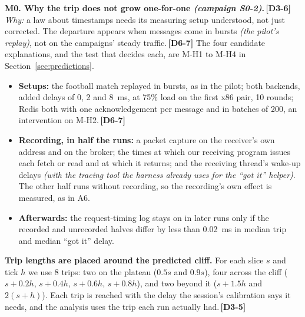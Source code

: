 \documentclass[11pt]{article}
\newcommand{\gl}[1]{{\color{soft}\itshape\small (#1)}}
\newcommand{\chgold}[1]{\,{\color{oldcol}\bfseries\footnotesize[#1]}}
\begin{document}
\textbf{M0. Why the trip does not grow one-for-one \gl{campaign S0-2}.}\chgold{D3-6} \emph{Why:} a law about timestamps needs its measuring setup understood, not just corrected. The departure appears when messages come in bursts \gl{the pilot's replay}, not on the campaigns' steady traffic.\chgold{D6-7} The four candidate explanations, and the test that decides each, are M-H1 to M-H4 in Section~\ref{sec:predictions}.
\begin{itemize}
  \item \textbf{Setups:} the football match replayed in bursts, as in the pilot; both backends, added delays of 0, 2 and 8~ms, at 75\% load on the first x86 pair, 10 rounds; Redis both with one acknowledgement per message and in batches of 200, an intervention on M-H2.\chgold{D6-7}
  \item \textbf{Recording, in half the runs:} a packet capture on the receiver's own address and on the broker; the times at which our receiving program issues each fetch or read and at which it returns; and the receiving thread's wake-up delays \gl{with the tracing tool the harness already uses for the ``got it'' helper}. The other half runs without recording, so the recording's own effect is measured, as in A6.
  \item \textbf{Afterwards:} the request-timing log stays on in later runs only if the recorded and unrecorded halves differ by less than 0.02~ms in median trip and median ``got it'' delay.
\end{itemize}

\textbf{Trip lengths are placed around the predicted cliff.} For each slice $s$ and tick $h$ we use 8 trips: two on the plateau ($0.5s$ and $0.9s$), four across the cliff ($s + 0.2h$, $s + 0.4h$, $s + 0.6h$, $s + 0.8h$), and two beyond it ($s + 1.5h$ and $2(s + h)$). Each trip is reached with the delay the session's calibration says it needs, and the analysis uses the trip each run actually had.\chgold{D3-5}
\end{document}
